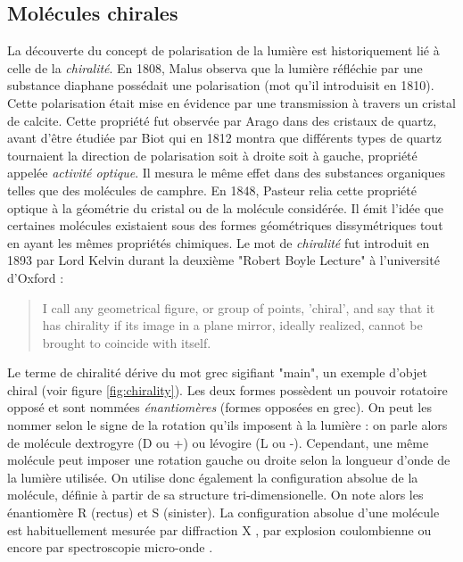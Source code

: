 \subsection{Molécules chirales}
La découverte du concept de polarisation de la lumière est historiquement lié à celle de la \textit{chiralité}. En 1808, Malus observa que la lumière réfléchie par une substance diaphane possédait une polarisation (mot qu'il introduisit en 1810). Cette polarisation était mise en évidence par une transmission à travers un cristal de calcite. Cette propriété fut observée par Arago dans des cristaux de quartz, avant d'être étudiée par Biot qui en 1812 montra que différents types de quartz tournaient la direction de polarisation soit à droite soit à gauche, propriété appelée \textit{activité optique}. Il mesura le même effet dans des substances organiques telles que des molécules de camphre. En 1848, Pasteur relia cette propriété optique à la géométrie du cristal ou de la molécule considérée. Il émit l'idée que certaines molécules existaient sous des formes géométriques dissymétriques tout en ayant les mêmes propriétés chimiques. Le mot de \textit{chiralité} fut introduit en 1893 par Lord Kelvin durant la deuxième "Robert Boyle Lecture" à l'université d'Oxford  :
\begin{quotation}
I call any geometrical figure, or group of points, 'chiral', and say that it has chirality if its image in a plane mirror, ideally realized, cannot be brought to coincide with itself.
\end{quotation}
Le terme de chiralité dérive du mot grec sigifiant "main", un exemple d'objet chiral (voir figure \ref{fig:chirality}). Les deux formes possèdent un pouvoir rotatoire opposé et sont nommées \textit{énantiomères} (formes opposées en grec). On peut les nommer selon le signe de la rotation qu'ils imposent à la lumière : on parle alors de molécule dextrogyre (D ou +) ou lévogire (L ou -). Cependant, une même molécule peut imposer une rotation gauche ou droite selon la longueur d'onde de la lumière utilisée. On utilise donc également la configuration absolue de la molécule, définie à partir de sa structure tri-dimensionelle. On note alors les énantiomère R (rectus) et S (sinister). La configuration absolue d'une molécule est habituellement mesurée par diffraction X , par explosion coulombienne  ou encore par spectroscopie micro-onde .

